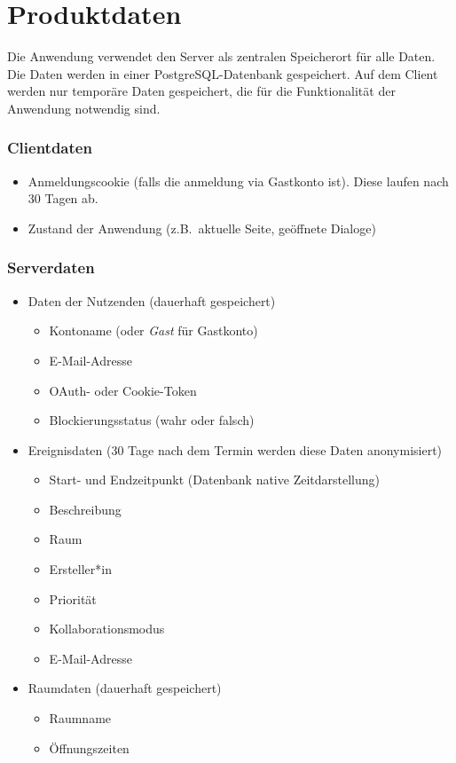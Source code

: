 
\chapter{Produktdaten}
\label{chap:product_data}

Die Anwendung verwendet den Server als zentralen Speicherort für alle Daten.
Die Daten werden in einer \gls{PostgreSQL}-Datenbank gespeichert.
Auf dem Client werden nur temporäre Daten gespeichert, die für die Funktionalität der Anwendung notwendig sind.


\subsection*{Clientdaten}
\begin{itemize}
    \item Anmeldungscookie (falls die anmeldung via Gastkonto ist).
          Diese laufen nach 30 Tagen ab.
    \item Zustand der Anwendung (z.B.\ aktuelle Seite, geöffnete Dialoge)
\end{itemize}

\subsection*{Serverdaten}
\begin{itemize}
    \item Daten der Nutzenden (dauerhaft gespeichert)
    \begin{itemize}
        \item Kontoname (oder \textit{Gast} für Gastkonto)
        \item E-Mail-Adresse
        \item OAuth- oder Cookie-Token
        \item Blockierungsstatus (wahr oder falsch)
    \end{itemize}
    \item Ereignisdaten (30 Tage nach dem Termin werden diese Daten anonymisiert)
    \begin{itemize}
        \item Start- und Endzeitpunkt (Datenbank native Zeitdarstellung)
        \item Beschreibung
        \item Raum
        \item Ersteller*in
        \item Priorität
        \item Kollaborationsmodus
        \item E-Mail-Adresse
    \end{itemize}
    \item Raumdaten (dauerhaft gespeichert)
    \begin{itemize}
        \item Raumname
        \item Öffnungszeiten
    \end{itemize}
\end{itemize}
